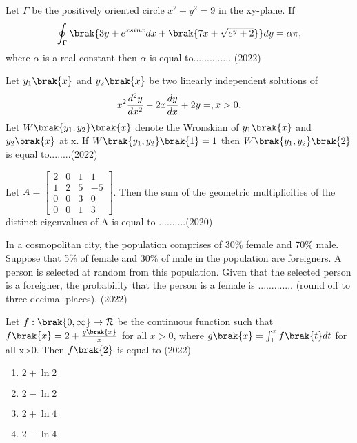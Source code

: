 
\iffalse
\chapter{2022}
\author{AI24BTECH11008}
\section{xe}
\fi

	\item Let $\Gamma$ be the positively oriented circle $x^2 + y^2 = 9$ in the xy-plane. If $$\oint_{\Gamma}\brak{3y + e^{xsinx}dx + \brak{7x+\sqrt{e^y + 2}}}dy =\alpha \pi,$$ where $\alpha$ is a real constant then $\alpha$ is equal to.............. \hfill (2022)
	\item Let $y_1\brak{x}$ and $y_2\brak{x}$ be two linearly independent solutions of $$x^2\frac{d^2y}{dx^2}-2x\frac{dy}{dx}+2y=, \hfill x>0.$$ Let $W\brak{y_1,y_2}\brak{x}$ denote the Wronskian of $y_1\brak{x}$ and $y_2\brak{x}$ at x. If $W\brak{y_1, y_2}\brak{1}=1$ then $W\brak{y_1, y_2}\brak{2}$ is equal to........\hfill (2022)
    \item Let $A = \begin{bmatrix}2 &0&1&1\\1&2&5&-5\\0&0&3&0\\0&0&1&3\end{bmatrix}$. Then the sum of the geometric multiplicities of the distinct eigenvalues of A is equal to ..........\hfill (2020)
    \item In a cosmopolitan city, the population comprises of 30\% female and 70\% male.
    Suppose that 5\% of female and 30\% of male in the population are foreigners. A person is selected at random from this population. Given that the selected person
    is a foreigner, the probability that the person is a female is ............. (round off to
    three decimal places). \hfill (2022)
    \item Let $f:\brak{0, \infty}\to \mathcal{R}$ be the continuous function such that $f\brak{x} = 2 + \frac{g\brak{x}}{x}$ for all $x>0$, where $g\brak{x}=\int_{1}^{x}f\brak{t}dt$ for all x>0. Then $f\brak{2}$ is equal to \hfill (2022)
    \begin{enumerate}[label = (\Alph*)]
        \item $2+\ln 2$
        \item $2-\ln 2$
        \item $2+\ln 4$
        \item $2-\ln 4$
    \end{enumerate}
